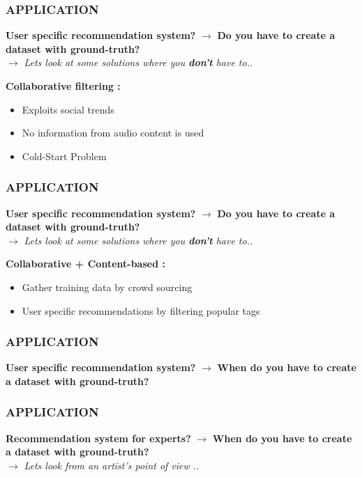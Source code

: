\documentclass{beamer}
\begin{document}
\begin{frame}
\frametitle{APPLICATION}
\begin{block}{\textbf{User specific recommendation system?}}
$\mathbf{\rightarrow}$ \textbf{Do you have to create a dataset with ground-truth?}\\
\pause
\qquad $\mathbf{\rightarrow}$ \textit{Lets look at some solutions where you \textbf{don't} have to..}

\end{block}
\bigskip

\textbf{Collaborative filtering :}
\begin{itemize}
\item {\color<2>[RGB]{0,100,0}Exploits social trends}
\item {No information from audio content is used}
\item {\color{red} Cold-Start Problem}
\end{itemize}
\end{frame}

\begin{frame}
\frametitle{APPLICATION}
\begin{block}{\textbf{User specific recommendation system?}}
$\mathbf{\rightarrow}$ \textbf{Do you have to create a dataset with ground-truth?}\\
\qquad $\mathbf{\rightarrow}$ \textit{Lets look at some solutions where you \textbf{don't} have to..}
\end{block}
\bigskip

\textbf{Collaborative + Content-based :}
\begin{itemize}
\item {Gather training data by crowd sourcing}
\item {User specific recommendations by filtering popular tags}
\end{itemize}
\end{frame}

\begin{frame}
\frametitle{APPLICATION}
\begin{block}{\textbf{User specific recommendation system?}}
$\mathbf{\rightarrow}$ \textbf{{\color{red} When} do you have to create a dataset with ground-truth?}
\end{block}
\end{frame}

\begin{frame}[noframenumbering]
\frametitle{APPLICATION}
\begin{block}{\textbf{Recommendation system for {\color{green} experts}?}}
$\mathbf{\rightarrow}$ \textbf{{\color{red} When} do you have to create a dataset with ground-truth?}\\
\qquad $\mathbf{\rightarrow}$ \textit{Lets look from an artist's point of view ..}

\end{block}
\end{frame}
\end{document}
